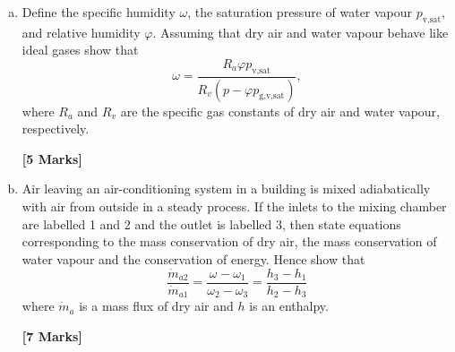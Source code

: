 \documentclass[calculator,steamtables,refrigeranttables,psychrometricchart,datasheet,sample]{exam}
\newcommand{\frc}{\displaystyle\frac}
\begin{document}
\clearpage


\begin{question} \vspace{-2\baselineskip}
\begin{enumerate}[(a)] 
\item Define the specific humidity $\omega$, the saturation pressure of water vapour $p_{\text{v,sat}}$, and relative humidity $\varphi$. Assuming that dry air and water vapour behave like ideal gases show that
\begin{displaymath}
\omega = \frc{R_{a}\varphi p_{\text{v,sat}}}{R_{v}\left(p - \varphi p_{\text{g,v,sat}}\right)},
\end{displaymath}
where $R_{a}$ and $R_{v}$ are the specific gas constants of dry air and water vapour, respectively. 
\begin{flushright}
{\bf [5 Marks]}
\end{flushright} 

\item Air leaving an air-conditioning system in a building is mixed adiabatically with air from outside in a steady process. If the inlets to the mixing chamber are labelled 1 and 2 and the outlet is labelled 3, then state equations corresponding to the mass conservation of dry air, the mass conservation of water vapour and the conservation of energy. Hence show that
\begin{displaymath}
\frc{\dot{m}_{a2}}{\dot{m}_{a1}} = \frc{\omega_{}-\omega_{1}}{\omega_{2}-\omega_{3}} = \frc{h_{3}-h_{1}}{h_{2}-h_{3}}
\end{displaymath}
where $\dot{m}_{a}$  is a mass flux of dry air and $h$ is an enthalpy.
\begin{flushright}
{\bf [7 Marks]}
\end{flushright} 


\end{enumerate}
\end{question}
\end{document}
